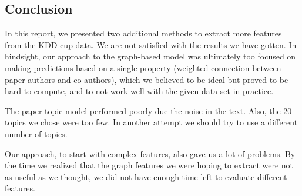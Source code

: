 \subsection{Conclusion}

In this report, we presented two additional methods to extract more features from the KDD cup data. We are not satisfied with the results we have gotten. In hindsight, our approach to the graph-based model was ultimately too focused on making predictions based on a single property (weighted connection between paper authors and co-authors), which we believed to be ideal but proved to be hard to compute, and to not work well with the given data set in practice. 

The paper-topic model performed poorly due the noise in the text. Also, the 20 topics we chose were too few. In another attempt we should try to use a different number of topics. 

Our approach, to start with complex features, also gave us a lot of problems.
By the time we realized that the graph features we were hoping to extract were not as useful as we thought, we did not have enough time left to evaluate different features.


